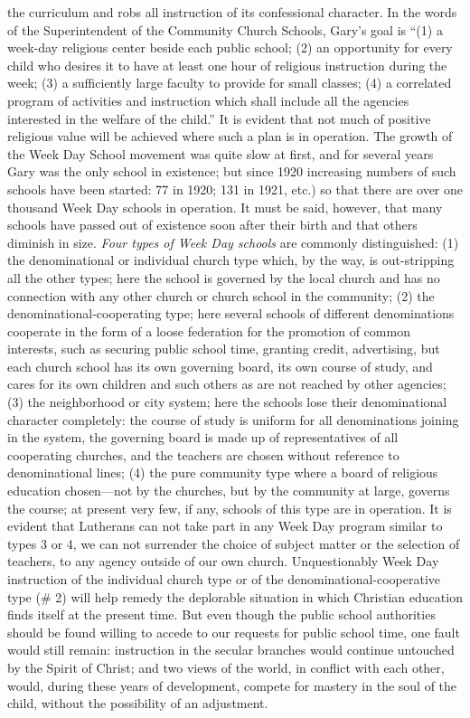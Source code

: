 the curriculum and robs all instruction of its confessional character. In the words of the Superintendent of the Community Church Schools, Gary’s goal is “(1) a week-day religious center beside each public school; (2) an opportunity for every child who desires it to have at least one hour of religious instruction during the week; (3) a sufficiently large faculty to provide for small classes; (4) a correlated program of activities and instruction which shall include all the agencies interested in the welfare of the child.” It is evident that not much of positive religious value will be achieved where such a plan is in operation. The growth of the Week Day School movement was quite slow at first, and for several years Gary was the only school in existence; but since 1920 increasing numbers of such schools have been started: 77 in 1920; 131 in 1921, etc.) so that there are over one thousand Week Day schools in operation. It must be said, however, that many schools have passed out of existence soon after their birth and that others diminish in size. \emph{Four types of Week Day schools} are commonly distinguished: (1) the denominational or individual church type which, by the way, is out-stripping all the other types; here the school is governed by the local church and has no connection with any other church or church school in the community; (2) the denominational-cooperating type; here several schools of different denominations cooperate in the form of a loose federation for the promotion of common interests, such as securing public school time, granting credit, advertising, but each church school has its own governing board, its own course of study, and cares for its own children and such others as are not reached by other agencies; (3) the neighborhood or city system; here the schools lose their denominational character completely: the course of study is uniform for all denominations joining in the system, the governing board is made up of representatives of all cooperating churches, and the teachers
are chosen without reference to denominational lines; (4) the pure community type where a board of religious education chosen—not by the churches, but by the community at large, governs the course; at present very few, if any, schools of this type are in operation. It is evident that Lutherans can not take part in any Week Day program similar to types 3 or 4, we can not surrender the choice of subject matter or the selection of teachers, to any agency outside of our own church. Unquestionably Week Day instruction of the individual church type or of the denominational-cooperative type (\# 2) will help remedy the deplorable situation in which Christian education finds itself at the present time. But even though the public school authorities should be found willing to accede to our requests for public school time, one fault would still remain: instruction in the secular branches would continue untouched by the Spirit of Christ; and two views of the world, in conflict with each other, would, during these years of development, compete for mastery in the soul of the child, without the possibility of an adjustment.
